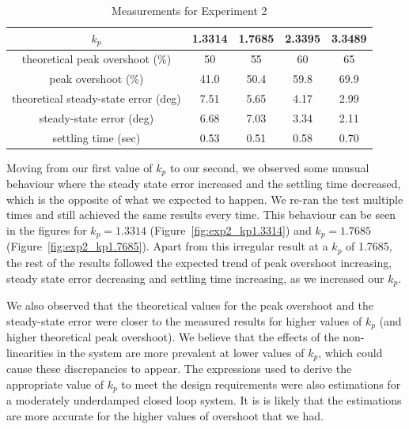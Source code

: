 \documentclass[12pt]{article}
\begin{document}
\begin{table}[h!]
\centering
\begin{tabular}{|c|c|c|c|c|} \hline
    $k_p$ & 1.3314 & 1.7685 & 2.3395 & 3.3489 \\ \hline
    theoretical peak overshoot (\%) & 50 & 55 & 60 & 65 \\ \hline
    peak overshoot (\%) & 41.0 & 50.4 & 59.8 & 69.9 \\ \hline
    theoretical steady-state error (deg) & 7.51 & 5.65 & 4.17 & 2.99 \\ \hline
    steady-state error (deg) & 6.68 & 7.03 & 3.34 & 2.11 \\ \hline
    settling time (sec) & 0.53 & 0.51 & 0.58 & 0.70 \\ \hline 
\end{tabular}
\caption{\label{table:exp2_measurements}Measurements for Experiment 2}
\end{table}

Moving from our first value of $k_p$ to our second, we observed some unusual behaviour where the steady state error increased and the settling time decreased, which is the opposite of what we expected to happen. We re-ran the test multiple times and still achieved the same results every time. This behaviour can be seen in the figures for $k_p = 1.3314$ (Figure~\ref{fig:exp2_kp1.3314}) and $k_p = 1.7685$ (Figure~\ref{fig:exp2_kp1.7685}). Apart from this irregular result at a $k_p$ of 1.7685, the rest of the results followed the expected trend of peak overshoot increasing, steady state error decreasing and settling time increasing, as we increased our $k_p$.

We also observed that the theoretical values for the peak overshoot and the steady-state error were closer to the measured results for higher values of $k_p$ (and higher theoretical peak overshoot). We believe that the effects of the non-linearities in the system are more prevalent at lower values of $k_p$, which could cause these discrepancies to appear. The expressions used to derive the appropriate value of $k_p$ to meet the design requirements were also estimations for a moderately underdamped closed loop system. It is is likely that the estimations are more accurate for the higher values of overshoot that we had. 

\setcounter{section}{5}
\end{document}
